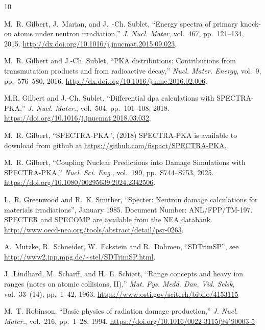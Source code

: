 \documentclass[a4paper]{article}
\begin{document}
\begin{thebibliography}{10}

M.~R. Gilbert, J.~Marian, and J.~{\relax -Ch}. Sublet, ``Energy spectra of
  primary knock-on atoms under neutron irradiation,'' {\em J. Nucl. Mater},
  vol.~467, pp.~121--134, 2015.
\newblock \url{http://dx.doi.org/10.1016/j.jnucmat.2015.09.023}.

M.~R. Gilbert and J.-{\relax Ch}. Sublet, ``{{PKA distributions: Contributions
  from transmutation products and from radioactive decay}},'' {\em Nucl. Mater.
  Energy}, vol.~9, pp.~576--580, 2016.
    \newblock \url{http://dx.doi.org/10.1016/j.nme.2016.02.006}.






M.R. Gilbert and J.-Ch. Sublet, ``{{Differential dpa calculations with
  SPECTRA-PKA}},'' {\em J. Nucl. Mater.}, vol.~504, pp.~101--108, 2018.
    \newblock \url{https://doi.org/10.1016/j.jnucmat.2018.03.032}.

M.~R. Gilbert, ``{SPECTRA-PKA}'',  (2018) {SPECTRA-PKA is available to download
  from github at \url{https://github.com/fispact/SPECTRA-PKA}}.
  
  
M.~R. Gilbert, ``{{Coupling Nuclear Predictions into Damage Simulations with SPECTRA-PKA}},'' {\em Nucl. Sci.
  Eng.}, vol.~199, pp.~S744--S753, 2025.
    \newblock \url{https://doi.org/10.1080/00295639.2024.2342506}.

L.~R. Greenwood and R.~K. Smither,
  ``Specter: Neutron damage calculations for materials
  irradiations'', January 1985. Document Number:
  ANL/FPP/TM-197. SPECTER and SPECOMP are available from the NEA databank.
\newblock \url{http://www.oecd-nea.org/tools/abstract/detail/psr-0263}.

A.~Mutzke, R.~Schneider, W.~Eckstein and R.~Dohmen, ``{SDTrimSP}'',  {see \url{http://www2.ipp.mpg.de/~stel/SDTrimSP.html}}.

J.~Lindhard, M.~Scharff, and H.~E. Schi{\o}tt,
  ``{{Range concepts and heavy
  ion ranges (notes on atomic collisions, {II})}},'' {\em Mat. Fys. Medd. Dan. Vid.
  Selsk}, vol.~33~(14), pp.~1--42, 1963.
\newblock\url{https://www.osti.gov/scitech/biblio/4153115}

M.~T. Robinson, ``{{Basic physics of radiation damage production}},'' {\em J. Nucl. Mater.}, vol.~216, pp.~1--28, 1994.
\newblock
  \url{https://doi.org/10.1016/0022-3115(94)90003-5}



\end{thebibliography}
\end{document}
